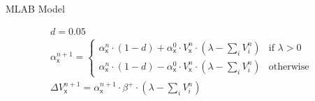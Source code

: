 \documentclass[border=10pt,varwidth]{standalone}
\begin{document}
\begin{center}
	\huge
	\sffamily
	MLAB Model
\end{center}
\newcommand{\eks}{\textsf{x}}
\begin{equation*}
	\begin{gathered}
		d = 0.05 \\[1ex]
		\alpha_\eks^{n + 1} = \begin{cases}
			\alpha_\eks^n \cdot (1 - d) + \alpha_\eks^0 \cdot V_\eks^n \cdot \left( \lambda - \textstyle\sum_i V^n_i \right) &\text{if } \lambda > 0 \\
			\alpha_\eks^n \cdot (1 - d) - \alpha_\eks^0 \cdot V_\eks^n \cdot \left( \lambda - \textstyle\sum_i V^n_i \right) &\text{otherwise}
		\end{cases} \\[1ex]
		\Delta V_{\eks}^{n+1} = \alpha_\eks^{n + 1} \cdot \beta^+ \cdot \left( \lambda - \textstyle\sum_i V_i^{n} \right)
	\end{gathered}
	\label{linear_alpha}
\end{equation*}
\end{document}
